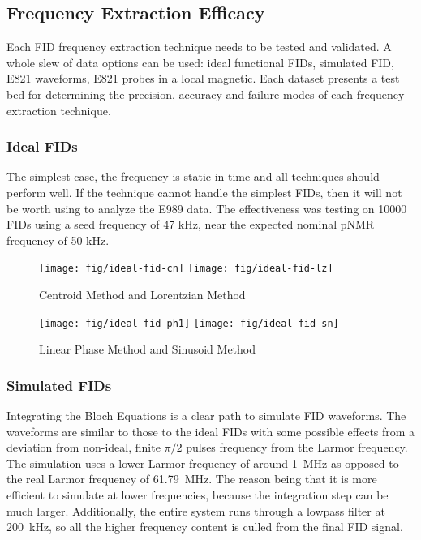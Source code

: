 
\subsection{Frequency Extraction Efficacy}

Each FID frequency extraction technique needs to be tested and validated.  A whole slew of data options can be used: ideal functional FIDs, simulated FID, E821 waveforms, E821 probes in a local \uw magnetic.  Each dataset presents a test bed for determining the precision, accuracy and failure modes of each frequency extraction technique.

\subsubsection{Ideal FIDs}
The simplest case, the frequency is static in time and all techniques should perform well.  If the technique cannot handle the simplest FIDs, then it will not be worth using to analyze the E989 data.  The effectiveness was testing on 10000 FIDs using a seed frequency of 47 kHz, near the expected nominal pNMR frequency of 50 kHz.  

\begin{figure}
    \label{fig:ideal-fid-spectral}
    \texttt{[image: fig/ideal-fid-cn]}
    \texttt{[image: fig/ideal-fid-lz]}
    \caption{Centroid Method and Lorentzian Method}
\end{figure}

\begin{figure}
    \label{fig:ideal-fid-time-domain}
    \texttt{[image: fig/ideal-fid-ph1]}
    \texttt{[image: fig/ideal-fid-sn]}
    \caption{Linear Phase Method and Sinusoid Method}
\end{figure}


\subsubsection{Simulated FIDs}
Integrating the Bloch Equations is a clear path to simulate FID waveforms.  The waveforms are similar to those to the ideal FIDs with some possible effects from a deviation from non-ideal, finite $\pi/2$ pulses frequency from the Larmor frequency.  The simulation uses a lower Larmor frequency of around \SI{1}{\MHz} as opposed to the real Larmor frequency of \SI{61.79}{\MHz}.  The reason being that it is more efficient to simulate at lower frequencies, because the integration step can be much larger.  Additionally, the entire system runs through a lowpass filter at \SI{200}{\kHz}, so all the higher frequency content is culled from the final FID signal.

